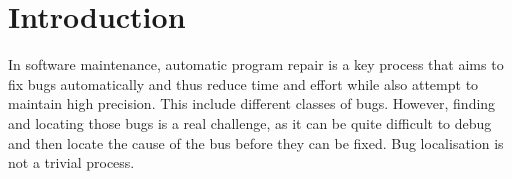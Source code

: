 \documentclass[sigconf,review,anonymous]{acmart}
\begin{document}




\maketitle

\section{Introduction}
In software maintenance, automatic program repair is a key process that aims to fix bugs automatically and thus reduce time and effort while also attempt to maintain high precision. This include different classes of bugs. However, finding and locating those bugs is a real challenge, as it can be quite difficult to debug and then locate the cause of the bus before they can be fixed. Bug localisation is not a trivial process.
\end{document}
